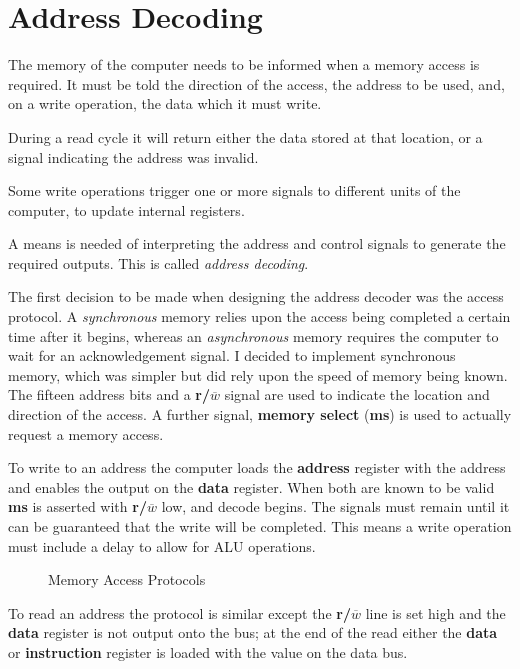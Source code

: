 \section{Address Decoding}

The memory of the computer needs to be informed when a memory access is required. It must be told the direction of the access, the address to be
used, and, on a write operation, the data which it must write.

During a read cycle it will return either the data stored at that location, or a signal indicating the address was invalid.

Some write operations  trigger one or more signals to different units of the computer, to update internal registers.

A means is needed  of interpreting the address and control signals to generate the required outputs. This is called  {\em address decoding}.

The first decision to be made when designing the address decoder was
the access protocol. A {\em synchronous} memory relies upon the access being completed a certain time after it begins, whereas an {\em asynchronous} memory requires the computer to wait for an acknowledgement signal.
I decided to implement  synchronous  memory, which was simpler but did rely upon the speed of memory being known.  The fifteen 
address bits and a {\bf r/$\overline{w}$} signal are used to indicate the location and 
direction of the access. 
A further signal, {\bf memory select} ({\bf ms}) is used to 
actually request a memory access. 

To write to an address the computer loads the {\bf address} register with the address 
and enables the output on the {\bf data} register. When both are known to 
be valid  {\bf ms} is asserted with {\bf r/$\overline{w}$} low, and decode 
begins. The signals must remain until it can be guaranteed that the 
write will be completed.
 This means  a write operation must include a delay  to allow for ALU operations.

\begin{figure}
\vspace{20cm}
\caption{Memory Access Protocols}
\label{fig:memread}
\end{figure}


To read an address the protocol is similar except the {\bf r/$\overline{w}$} line is set high 
and the {\bf data} register is not output onto the bus;  at the end of the read 
either the {\bf data} or {\bf instruction} register is loaded with the value on the 
data bus.
